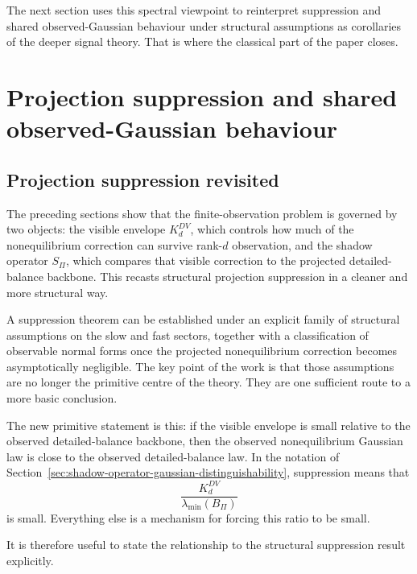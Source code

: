 \documentclass[11pt,a4paper]{article}
\numberwithin{equation}{section}
\theoremstyle{thmcompact}
\theoremstyle{remark}
\begin{document}
The next section uses this spectral viewpoint to reinterpret suppression and shared observed-Gaussian behaviour under structural assumptions as corollaries of the deeper signal theory. That is where the classical part of the paper closes.

\section{Projection suppression and shared observed-Gaussian behaviour}
\label{sec:projection-suppression-universality}

\subsection{Projection suppression revisited}

The preceding sections show that the finite-observation problem is governed by two objects: the visible envelope \(K_d^{DV}\), which controls how much of the nonequilibrium correction can survive rank-\(d\) observation, and the shadow operator \(S_\Pi\), which compares that visible correction to the projected detailed-balance backbone. This recasts structural projection suppression in a cleaner and more structural way.

A suppression theorem can be established under an explicit family of structural assumptions on the slow and fast sectors, together with a classification of observable normal forms once the projected nonequilibrium correction becomes asymptotically negligible. The key point of the work is that those assumptions are no longer the primitive centre of the theory. They are one sufficient route to a more basic conclusion.

The new primitive statement is this: if the visible envelope is small relative to the observed detailed-balance backbone, then the observed nonequilibrium Gaussian law is close to the observed detailed-balance law. In the notation of Section~\ref{sec:shadow-operator-gaussian-distinguishability}, suppression means that
\begin{equation}
\frac{K_d^{DV}}{\lambda_{\min}(B_\Pi)}
\end{equation}
is small. Everything else is a mechanism for forcing this ratio to be small.

It is therefore useful to state the relationship to the structural suppression result explicitly.
\end{document}
